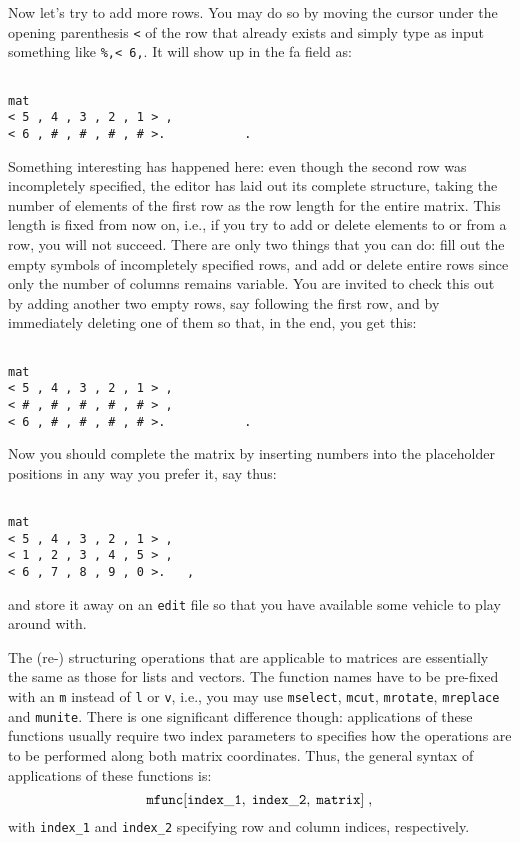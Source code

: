 Now let's  try to add more rows. You may do so by moving the cursor under the opening parenthesis {\tt <} of the row that already
exists and simply type as input something like {\tt \%,< 6,}. It will show up in the {\sc  fa} field as:
\begin{verbatim}

mat 
< 5 , 4 , 3 , 2 , 1 > ,
< 6 , # , # , # , # >.           .

\end{verbatim}
Something interesting has happened here: even though the second
row was incompletely specified, the editor has laid out its complete
structure, taking the number of elements of the first row as the
row length for the entire matrix. This length is fixed from now on, i.e., if you try to add or delete elements to or from
a row, you will not succeed. There are only two things that you
can do: fill out the empty symbols of incompletely specified
 rows, and add or delete entire rows since only the number of 
columns remains variable. 
You are invited to check this out by adding another two empty
rows, say following the first row, and by immediately deleting
one of them so that, in the end, you get this:
\begin{verbatim}
  
mat 
< 5 , 4 , 3 , 2 , 1 > ,
< # , # , # , # , # > ,
< 6 , # , # , # , # >.           .

\end{verbatim}
Now you should complete the matrix by inserting numbers
into the placeholder positions in any way you prefer it,
say thus:
\begin{verbatim}

mat 
< 5 , 4 , 3 , 2 , 1 > ,
< 1 , 2 , 3 , 4 , 5 > ,
< 6 , 7 , 8 , 9 , 0 >.   ,

\end{verbatim}
and store it away on an {\tt edit} file so that you have available
some vehicle to play around with. 

The (re-) {\mys structuring operations} that are applicable to
matrices are essentially the same as those for lists and
vectors. The function names have to be pre-fixed with an {\tt m}
instead of {\tt l} or {\tt v}, i.e., you may use {\tt mselect},
{\tt mcut}, {\tt mrotate}, {\tt mreplace} and {\tt munite}.
There is one significant difference though: applications of
these functions usually require two
index parameters  to specifies how the operations are to
be performed along  both matrix coordinates.
Thus, the general syntax of applications of these functions is:
$$
{\tt mfunc[index\_1,\;index\_2,\;matrix]}\;,
$$
with {\tt index\_1} and {\tt index\_2}
specifying row and column indices, respectively. 
 
